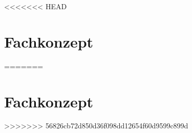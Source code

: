 <<<<<<< HEAD

\chapter{Fachkonzept}
\label{chp:fachkonzept}










\autorende

=======
\chapter{Fachkonzept}
\label{chp:fachkonzept}









>>>>>>> 56826cb72d850d36f098dd12654f60d9599c899d
